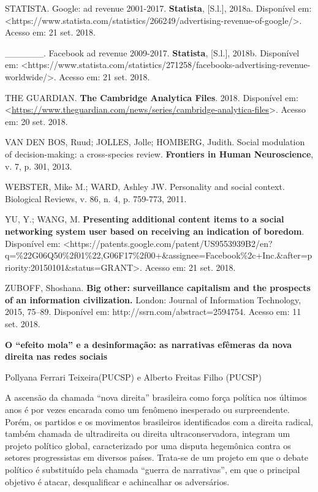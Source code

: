 STATISTA. Google: ad revenue 2001-2017. \textbf{Statista}, {[}S.l.{]},
2018a. Disponível em:
\textless{}https://www.statista.com/statistics/266249/advertising-revenue-of-google/\textgreater{}.
Acesso em: 21 set. 2018.

\_\_\_\_\_\_. Facebook ad revenue 2009-2017. \textbf{Statista},
{[}S.l.{]}, 2018b. Disponível em:
\textless{}https://www.statista.com/statistics/271258/facebooks-advertising-revenue-worldwide/\textgreater{}.
Acesso em: 21 set. 2018.

THE GUARDIAN. \textbf{The Cambridge Analytica Files}. 2018. Disponível
em:
\textless{}\url{https://www.theguardian.com/news/series/cambridge-analytica-files}\textgreater{}.
Acesso em: 20 set. 2018.

VAN DEN BOS, Ruud; JOLLES, Jolle; HOMBERG, Judith. Social modulation of
decision-making: a cross-species review. \textbf{Frontiers in Human
Neuroscience}, v. 7, p. 301, 2013.

WEBSTER, Mike M.; WARD, Ashley JW. Personality and social context.
Biological Reviews, v. 86, n. 4, p. 759-773, 2011.

YU, Y.; WANG, M. \textbf{Presenting additional content items to a social
networking system user based on receiving an indication of boredom}.
Disponível em:
\textless{}https://patents.google.com/patent/US9553939B2/en?q=\%22G06Q50\%2f01\%22,G06F17\%2f00+\&assignee=Facebook\%2c+Inc.\&after=priority:20150101\&status=GRANT\textgreater{}.
Acesso em: 21 set. 2018.

ZUBOFF, Shoshana. \textbf{Big other: surveillance capitalism and the
prospects of an information civilization.} London: Journal of
Information Technology, 2015, 75--89. Disponível em:
http://ssrn.com/abstract=2594754. Acesso em: 11 set. 2018.

\textbf{O ``efeito mola'' e a desinformação: as narrativas efêmeras da
nova direita nas redes sociais}

Pollyana Ferrari Teixeira(PUCSP) e Alberto Freitas Filho (PUCSP)

A ascensão da chamada ``nova direita'' brasileira como força política
nos últimos anos é por vezes encarada como um fenômeno inesperado ou
surpreendente. Porém, os partidos e os movimentos brasileiros
identificados com a direita radical, também chamada de ultradireita ou
direita ultraconservadora, integram um projeto político global,
caracterizado por uma disputa hegemônica contra os setores progressistas
em diversos países. Trata-se de um projeto em que o debate político é
substituído pela chamada ``guerra de narrativas'', em que o principal
objetivo é atacar, desqualificar e achincalhar os adversários.

